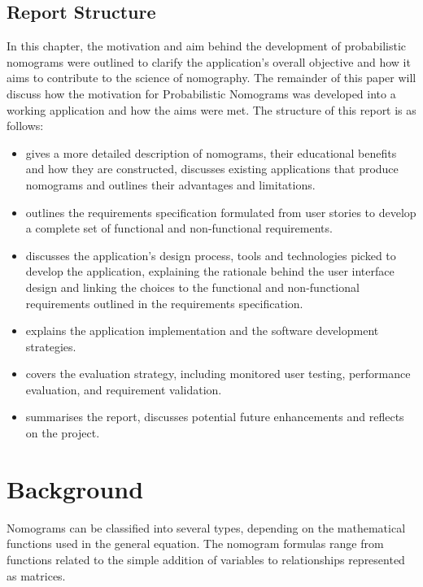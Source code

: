 \documentclass{l4proj}
\begin{document}
\section{Report Structure} 
In this chapter, the motivation and aim behind the development of probabilistic nomograms were outlined to clarify the application's overall objective and how it aims to contribute to the science of nomography. The remainder of this paper will discuss how the motivation for Probabilistic Nomograms was developed into a working application and how the aims were met. The structure of this report is as follows:
\begin{itemize}
    \item {} gives a more detailed description of nomograms, their educational benefits and how they are constructed, discusses existing applications that produce nomograms and outlines their advantages and limitations.
    \item {} outlines the requirements specification formulated from user stories to develop a complete set of functional and non-functional requirements.
    \item {} discusses the application's design process, tools and technologies picked to develop the application, explaining the rationale behind the user interface design and linking the choices to the functional and non-functional requirements outlined in the requirements specification. 
    \item {} explains the application implementation and the software development strategies.
    \item {} covers the evaluation strategy, including monitored user testing, performance evaluation, and requirement validation. 
    \item {} summarises the report, discusses potential future enhancements and reflects on the project. 
    
\end{itemize}



\chapter{Background}\label{background}


Nomograms can be classified into several types, depending on the mathematical functions used in the general equation. 
The nomogram formulas range from functions related to the simple addition of variables to relationships represented as matrices. \citep{boulet_PyNomo_2023} 
\end{document}
